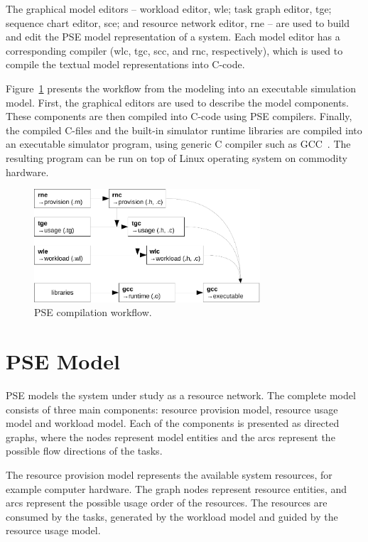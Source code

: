 The graphical model editors -- workload editor, wle; task graph editor, tge; sequence chart editor, sce; and resource network editor, rne -- are used to build and edit the PSE model representation of a system. Each model editor has a corresponding compiler (wlc, tgc, scc, and rnc, respectively), which is used to compile the textual model representations into C-code. %

Figure~\ref{fig:pse-compile-workflow} presents the workflow from the modeling into an executable simulation model. First, the graphical editors are used to describe the model components. These components are then compiled into C-code using PSE compilers. Finally, the compiled C-files and the built-in simulator runtime libraries are compiled into an executable simulator program, using generic C compiler such as GCC~\cite{stallman:2009:gcc}. The resulting program can be run on top of Linux operating system on commodity hardware.

\begin{figure}[]
  \begin{center}
    \includegraphics[width=0.75\textwidth]{images/pse-compile-workflow.pdf}
    \caption{PSE compilation workflow.}
    \label{fig:pse-compile-workflow}
  \end{center}
\end{figure}

\section{PSE Model}
PSE models the system under study as a resource network. The complete model consists of three main components: resource provision model, resource usage model and workload model. Each of the components is presented as directed graphs, where the nodes represent model entities and the arcs represent the possible flow directions of the tasks.

The resource provision model represents the available system resources, for example computer hardware. The graph nodes represent resource entities, and arcs represent the possible usage order of the resources. The resources are consumed by the tasks, generated by the workload model and guided by the resource usage model.

